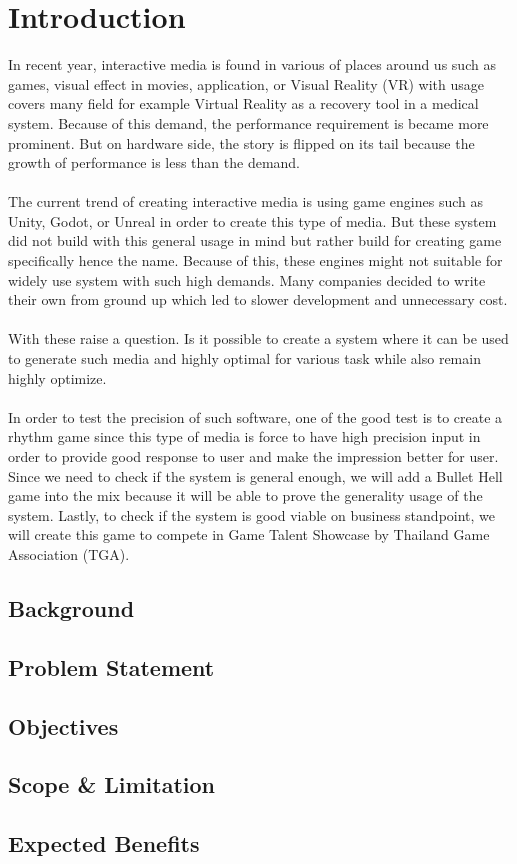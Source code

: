 \section{Introduction}
\label{sec:introduction}
In recent year, interactive media is found in various of places around us
such as games, visual effect in movies, application, or Visual Reality (VR)
with usage covers many field for example Virtual Reality as a recovery tool in a
medical system.
Because of this demand, the performance requirement is became more prominent.
But on hardware side, the story is flipped on its tail because the growth of performance
is less than the demand.
\\\\
The current trend of creating interactive media is using game engines such as Unity, Godot, or
Unreal in order to create this type of media.
But these system did not build with this general usage in mind but rather build for creating
game specifically hence the name.
Because of this, these engines might not suitable for widely use system with such high demands.
Many companies decided to write their own from ground up which led to slower development and
unnecessary cost.
\\\\
With these raise a question.
Is it possible to create a system where it can be used to generate such media and highly optimal
for various task while also remain highly optimize.
\\\\
In order to test the precision of such software, one of the good test is to create a rhythm game
since this type of media is force to have high precision input in order to provide good response
to user and make the impression better for user.
Since we need to check if the system is general enough, we will add a Bullet Hell game into the mix
because it will be able to prove the generality usage of the system.
Lastly, to check if the system is good viable on business standpoint, we will create this game
to compete in Game Talent Showcase by Thailand Game Association (TGA).

\subsection{Background}
\label{subsec:background}

\subsection{Problem Statement}
\label{subsec:problem-statement}

\subsection{Objectives}
\label{subsec:objectives}

\subsection{Scope \& Limitation}
\label{subsec:scope-and-limitation}

\subsection{Expected Benefits}
\label{subsec:expected-benefits}